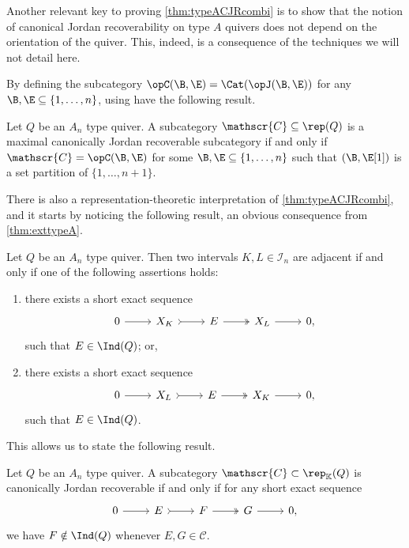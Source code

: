 Another relevant key to proving \cref{thm:typeACJRcombi} is to show that the notion of canonical Jordan recoverability on type $A$ quivers does not depend on the orientation of the quiver. This, indeed, is a consequence of the techniques we will not detail here.

By defining the subcategory $\opC(\B,\E) = \Cat(\opJ(\B,\E))$ for any $\B,\E \subseteq \{1,\ldots,n\}$, using  have the following result. 

\begin{theorem} \label{thm:CJRmaxcomb}
    Let $Q$ be an $A_n$ type quiver. A subcategory $\mathscr{C} \subseteq \rep(Q)$ is a maximal canonically Jordan recoverable subcategory if and only if $\mathscr{C} = \opC(\B,\E)$ for some $\B,\E \subseteq \{1,\ldots,n\}$ such that $(\B,\E[1])$ is a set partition of $\{1,\ldots,n+1\}$.
\end{theorem}

There is also a representation-theoretic interpretation of \cref{thm:typeACJRcombi}, and it starts by noticing the following result, an obvious consequence from \cref{thm:exttypeA}.

\begin{lemma} \label{lem:adj=arrow} Let $Q$ be an $A_n$ type quiver. Then two intervals $K,L \in \mathcal{I}_n$ are adjacent if and only if one of the following assertions holds:
\begin{enumerate}[label=$\bullet$, itemsep=1mm]
    \item there exists a short exact sequence \[\begin{tikzcd}
	0 & X_K & E  & X_L&  0,
	\arrow[from=1-1, to=1-2]
	\arrow[tail, from=1-2, to=1-3]
	\arrow[two heads,from=1-3, to=1-4]
	\arrow[from=1-4, to=1-5]
\end{tikzcd} \] such that $E \in \Ind(Q)$; or,
    \item there exists a short exact sequence \[\begin{tikzcd}
	0 & X_L & E  & X_K&  0,
	\arrow[from=1-1, to=1-2]
	\arrow[tail, from=1-2, to=1-3]
	\arrow[two heads,from=1-3, to=1-4]
	\arrow[from=1-4, to=1-5]
\end{tikzcd} \] such that $E \in \Ind(Q)$.
\end{enumerate}
\end{lemma}

This allows us to state the following result.

 \begin{theorem} \label{thm:CJRreptheory}
     Let $Q$ be an $A_n$ type quiver. A subcategory $\mathscr{C} \subset \rep_\mathbb{K}(Q)$ is canonically Jordan recoverable if and only if for any short exact sequence \[\begin{tikzcd}
	0 & E & F  & G &  0,
	\arrow[from=1-1, to=1-2]
	\arrow[tail, from=1-2, to=1-3]
	\arrow[two heads,from=1-3, to=1-4]
	\arrow[from=1-4, to=1-5]
\end{tikzcd}\] we have $F \notin \Ind(Q)$ whenever $E,G \in \mathscr{C}$.
 \end{theorem}

